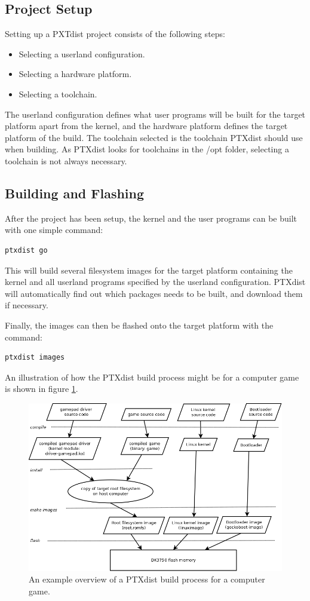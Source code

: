 \subsection{Project Setup}
Setting up a PXTdist project consists of the following steps:
\begin{itemize}
  \item Selecting a userland configuration.
  \item Selecting a hardware platform.
  \item Selecting a toolchain.
\end{itemize}
The userland configuration defines what user programs will be built for the target platform apart from the kernel, and the hardware platform defines the target platform of the build. The toolchain selected is the toolchain PTXdist should use when building. As PTXdist looks for toolchains in the /opt folder, selecting a toolchain is not always necessary.

\subsection{Building and Flashing}
After the project has been setup, the kernel and the user programs can be built with one simple command:
\lstset{style=lststyle-terminal}
\begin{lstlisting}
ptxdist go
\end{lstlisting}
This will build several filesystem images for the target platform containing the kernel and all userland programs specified by the userland configuration. PTXdist will automatically find out which packages needs to be built, and download them if necessary.

Finally, the images can then be flashed onto the target platform with the command:
\lstset{style=lststyle-terminal}
\begin{lstlisting}
ptxdist images
\end{lstlisting}
An illustration of how the PTXdist build process might be for a computer game is shown in figure \ref{fig:ptxdist-build-process}.

\begin{figure}[ht]\label{fig:ptxdist-build-process}
  \includegraphics[width=\textwidth]{images/ptxdist_build_process.png}
  \caption{An example overview of a PTXdist build process for a computer game.}
\end{figure}

